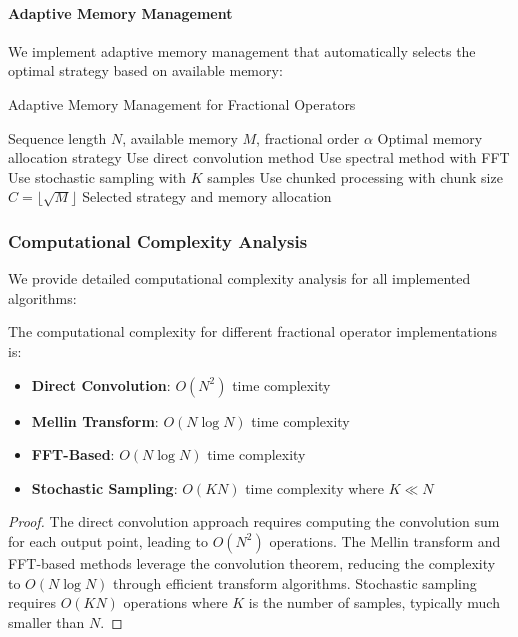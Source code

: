 \paragraph{Adaptive Memory Management}

We implement adaptive memory management that automatically selects the optimal strategy based on available memory:

\begin{algorithm}[h]
\caption{Adaptive Memory Management for Fractional Operators}
\begin{algorithmic}[1]
\Require Sequence length $N$, available memory $M$, fractional order $\alpha$
\Ensure Optimal memory allocation strategy
    \State Use direct convolution method
    \State Use spectral method with FFT
    \State Use stochastic sampling with $K$ samples
\Else
    \State Use chunked processing with chunk size $C = \lfloor \sqrt{M} \rfloor$
\EndIf
\Return Selected strategy and memory allocation
\end{algorithmic}
\end{algorithm}

\subsubsection{Computational Complexity Analysis}

We provide detailed computational complexity analysis for all implemented algorithms:

\begin{theorem}
The computational complexity for different fractional operator implementations is:
\begin{itemize}
\item \textbf{Direct Convolution}: $O(N^2)$ time complexity
\item \textbf{Mellin Transform}: $O(N \log N)$ time complexity
\item \textbf{FFT-Based}: $O(N \log N)$ time complexity
\item \textbf{Stochastic Sampling}: $O(KN)$ time complexity where $K \ll N$
\end{itemize}
\end{theorem}

\begin{proof}
The direct convolution approach requires computing the convolution sum for each output point, leading to $O(N^2)$ operations. The Mellin transform and FFT-based methods leverage the convolution theorem, reducing the complexity to $O(N \log N)$ through efficient transform algorithms. Stochastic sampling requires $O(KN)$ operations where $K$ is the number of samples, typically much smaller than $N$.
\end{proof}

